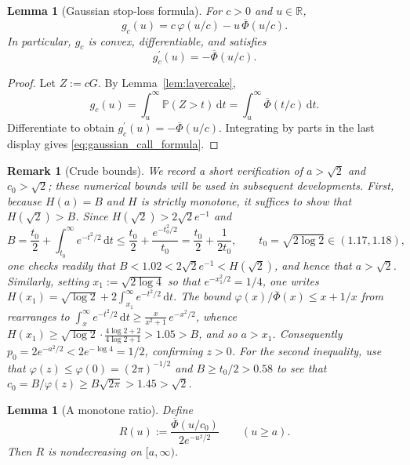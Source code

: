 \documentclass[11pt]{article}
\newcommand{\R}{\mathbb{R}}
\newcommand{\Pbb}{\mathbb{P}}
\newtheorem{lemma}[theorem]{Lemma}
\newtheorem{remark}[theorem]{Remark}
\newcommand{\phin}{\varphi}
\newcommand{\Phib}{\overline{\Phi}}
\begin{document}
\begin{lemma}[Gaussian stop-loss formula]
\label{lem:gaussian_call}
For $c > 0$ and $u \in \R$,
%
\begin{equation}
\label{eq:gaussian_call_formula}
g_c(u) =c \, \phin (u/c) - u \, \Phib(u/c).
\end{equation}
%
In particular, $g_c$ is convex, differentiable, and satisfies
%
\begin{equation}
\label{eq:gc_derivative}
g_c^{\prime}(u)=-\Phib(u/c).
\end{equation}
%
\end{lemma}

\begin{proof}
Let $Z := c G$.  By Lemma~\ref{lem:layercake},
%
\[
g_c(u) = \int_u^\infty \Pbb(Z>t)\, \mathrm{d}t = \int_u^\infty \Phib(t/c)\, \mathrm{d}t.
\]
%
Differentiate to obtain $g_c^{\prime} (u)=-\Phib(u/c)$.
Integrating by parts in the last display gives \eqref{eq:gaussian_call_formula}.
\end{proof}

\begin{remark}[Crude bounds]
\label{rem:crude_bounds}
We record a short verification of $a > \sqrt{2}$ and $c_0 > \sqrt{2}$; these numerical bounds will be used in subsequent developments. 
First, because $H(a) = B$ and $H$ is strictly monotone, it suffices to show that $H(\sqrt{2})>B$.
Since $H (\sqrt{2}) > 2\sqrt{2}e^{-1}$ and
%
\[
B = \frac{t_0}{2} + \int_{t_0}^\infty e^{-t^2/2} \, \mathrm{d}t
\le \frac{t_0}{2} + \frac{e^{-t_0^2/2}}{t_0} = \frac{t_0}{2} + \frac{1}{2t_0},
\qquad t_0 = \sqrt{2\log 2} \in (1.17,1.18),
\]
%
one checks readily that $B < 1.02 < 2\sqrt{2}e^{-1} < H(\sqrt{2})$, and hence that $a > \sqrt{2}$.
Similarly, setting $x_1 := \sqrt{2\log 4}$ so that $e^{-x_1^2/2}=1/4$, one writes
$H(x_1) = \sqrt{\log 2} + 2\int_{x_1}^\infty e^{-t^2/2}\,\mathrm{d}t$.
The bound $\phin(x)/\Phib(x)\le x+1/x$ from \cite[Eq.~7.1.13]{AbramowitzStegun}
rearranges to $\int_x^\infty e^{-t^2/2}\,\mathrm{d}t\ge \frac{x}{x^2+1}\,e^{-x^2/2}$,
whence
$H(x_1) \ge \sqrt{\log 2}\cdot\frac{4\log 2 + 2}{4\log 2 + 1} > 1.05 > B$,
and so $a > x_1$.
Consequently $p_0 = 2e^{-a^2/2} < 2e^{-\log 4} = 1/2$, confirming $z > 0$.
For the second inequality, use that $\phin(z)\le \phin(0)=(2\pi)^{-1/2}$ and $B \ge t_0/2 > 0.58$ to see that
$c_0 = B / \phin(z) \ge B \sqrt{2\pi} > 1.45 > \sqrt{2}$.
\end{remark}

\begin{lemma}[A monotone ratio]
\label{lem:Rmono}
Define
%
\[
R(u) := \frac{\Phib(u/c_0)}{2e^{-u^2/2}} \qquad(u \ge a).
\]
%
Then $R$ is nondecreasing on $[a, \infty)$.
\end{lemma}
\end{document}
